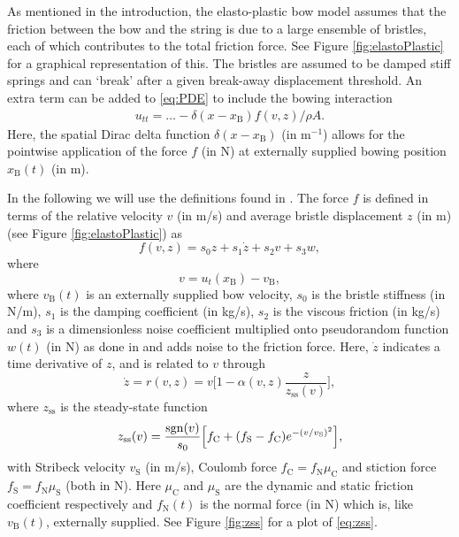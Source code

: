     As mentioned in the introduction, the elasto-plastic bow model assumes that the friction between the bow and the string is due to a large ensemble of bristles, each of which contributes to the total friction force. See Figure \ref{fig:elastoPlastic} for a graphical representation of this. The bristles are assumed to be damped stiff springs and can `break' after a given break-away displacement threshold. An extra term can be added to \eqref{eq:PDE} to include the bowing interaction
    \begin{equation}
        \begin{aligned}
        \label{eq:bowingTerm}
            u_{tt} = \hdots - \delta(x-x_\text{B})f(v, z)/\rho A.
        \end{aligned}
    \end{equation}
    Here, the spatial Dirac delta function $\delta(x-x_\text{B})$ (in m$^{-1}$) allows for the pointwise application of the force $f$ (in N) at externally supplied bowing position $x_\text{B}(t)$ (in m). 
    
     In the following we will use the definitions found in \cite{Dupont2002}. The force $f$ is defined in terms of the relative velocity $v$ (in m/s) and average bristle displacement $z$ (in m) (see Figure \ref{fig:elastoPlastic}) as
    \begin{equation}\label{eq:forceFunction}
        f(v, z) = s_0z + s_1\dot z + s_2v + s_3w,
    \end{equation}
    where \begin{equation}\label{eq:relVel}
      v = u_t(x_\text{B}) - v_\text{B},
    \end{equation}
    where $v_\text{B}(t)$ is an externally supplied bow velocity,
    $s_0$ is the bristle stiffness (in N/m), $s_1$ is the damping coefficient (in kg/s), $s_2$ is the viscous friction (in kg/s) and $s_3$ is a dimensionless noise coefficient multiplied onto pseudorandom function $w(t)$ (in N) as done in \cite{Serafin2004} and adds noise to the friction force. Here, $\dot{z}$ indicates a time derivative of $z$, and is related to $v$ through
    \begin{equation}\label{eq:zdot}
        \dot z = r(v, z) = v \bigg[ 1-  \alpha(v, z)\frac{z}{z_\text{ss}(v)}\bigg],
    \end{equation}
    where $z_\text{ss}$ is the steady-state function
    \begin{equation}\label{eq:zss}
        z_\text{ss}(v) = \frac{\operatorname{sgn}(v)}{s_0}\Big[f_\text{C}+(f_\text{S}-f_\text{C})e^{-(v/v_\text{S})^2}\Big],
    \end{equation}
    with Stribeck velocity $v_\text{S}$ (in m/s), Coulomb force $f_\text{C} = f_\text{N}\mu_\text{C}$ and stiction force $f_\text{S} = f_\text{N}\mu_\text{S}$ (both in N). Here $\mu_\text{C}$ and $\mu_\text{S}$ are the dynamic and static friction coefficient respectively and $f_\text{N}(t)$ is the normal force (in N) which is, like $v_\text{B}(t)$, externally supplied. See Figure \ref{fig:zss} for a plot of \eqref{eq:zss}. 
    
